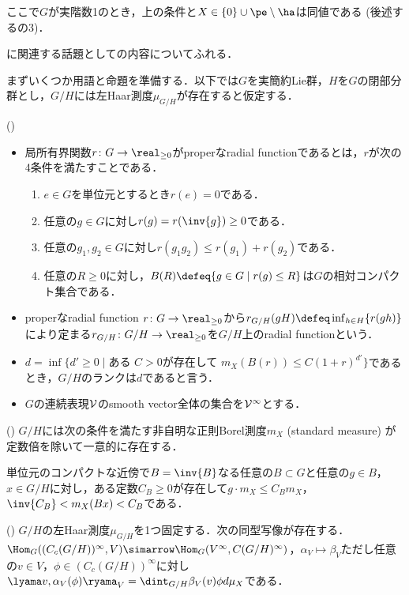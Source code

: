 ここで$G$が実階数1のとき，上の条件と$X\in \{0\}\cup\pe\setminus\ha $は同値である (後述するの3)．



に関連する話題として\cite{ber88}の内容についてふれる．

まずいくつか用語と命題を準備する．以下では$G$を実簡約Lie群，$H$を$G$の閉部分群とし，$G/H$には左Haar測度$\mu_{G/H} $が存在すると仮定する．
\begin{defi*}(\cite{ber88})
  \leavevmode\vspace{-1em}
  \begin{itemize}
  \item 局所有界関数$r\colon G\to \real_{\geq 0} $がproperなradial functionであるとは，$r$が次の4条件を満たすことである．
    \begin{enumerate}
    \item $e\in G$を単位元とするとき$r(e) = 0 $である．
    \item 任意の$g\in G$に対し$r(g) = r(\inv{g})\geq 0  $である．
    \item 任意の$g_1,g_2\in G$に対し$r(g_1g_2)\leq r(g_1) + r(g_2)  $である．
    \item 任意の$R\geq 0$に対し，$B(R)\defeq \{g\in G\mid r(g)\leq R \} $は$G$の相対コンパクト集合である．
    \end{enumerate}
  \item properなradial function $r\colon G\to \real_{\geq 0} $から$r_{G/H}(gH)\defeq \inf_{h\in H}\{r(gh) \}$により定まる${r_{G/H}\colon G/H\to \real_{\geq 0}}$を$G/H$上のradial functionという．
  \item $d = \inf\{d'\geq 0\mid \text{ある } C > 0\text{が存在して }  m_X(B(r))\leq C(1+r)^{d'}\} $であるとき，$G/H$のランクは$d$であると言う．
  \item $G$の連続表現$\cal{V} $のsmooth vector全体の集合を$\cal{V}^{\infty} $とする．
  \end{itemize}
\end{defi*}
\begin{thmdef*}(\cite[p.~683]{ber88})
  $G/H$には次の条件を満たす非自明な正則Borel測度$m_X $ (standard measure) が定数倍を除いて一意的に存在する．

  単位元のコンパクトな近傍で$B = \inv{B} $なる任意の$B\subset G$と任意の$g\in B$，$x\in G/H$に対し，ある定数$C_B\geq 0 $が存在して$g\cdot m_X \leq C_B m_X$，$ \inv{C_B} < m_X(Bx) < C_{B}$である．
\end{thmdef*}
\begin{thmdef*}(\cite[p.~678]{ber88})
  $G/H$の左Haar測度$\mu_{G/H} $を1つ固定する．次の同型写像が存在する．$\Hom_{G}((C_c(G/H))^{\infty}, V )\simarrow \Hom_{G}(V^{\infty}, C(G/H)^{\infty}) $，$\alpha_V\mapsto \beta_V$ただし任意の$v\in V$，$\phi \in  (C_c(G/H))^{\infty} $に対し$ \lyama v,\alpha_V(\phi)\ryama_{V} = \dint_{G/H}\beta_V(v)\phi d\mu_X  $である．
\end{thmdef*}



